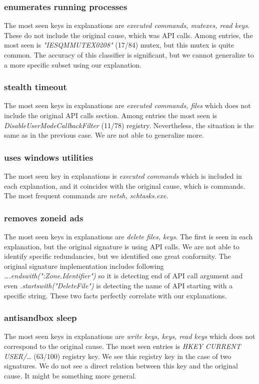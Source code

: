 \subsubsection*{enumerates running processes}
The most seen keys in explanations are \emph{executed commands, mutexes, read keys}. These do not include the original cause, which was API calls.  Among entries, the most seen is \emph{"IESQMMUTEX0208"} (17/84) mutex, but this mutex is quite common. The accuracy of this classifier is significant, but we cannot generalize to a more specific subset using our explanation.

\subsubsection*{stealth timeout}
The most seen keys in explanations are \emph{executed commands, files} which does not include the original API calls section. Among entries the most seen is \emph{DisableUserModeCallbackFilter} (11/78) registry. Nevertheless, the situation is the same as in the previous case. We are not able to generalize more.

\subsubsection*{uses windows utilities}
The most seen key in explanations is \emph{executed commands} which is included in each explanation, and it coincides with the original cause, which is commands. The most frequent commands are \emph{netsh, schtasks.exe}.

\subsubsection*{removes zoneid ads}
The most seen keys in explanations are \emph{delete files, keys}. The first is seen in each explanation, but the original signature is using API calls. We are not able to identify specific redundancies, but we identified one great conformity. The original signature implementation includes following \emph{\dots .endswith(":Zone.Identifier")} so it is detecting end of API call argument and even \emph{.startswith("DeleteFile")} is detecting the name of API starting with a specific string. These two facts perfectly correlate with our explanations.

\subsubsection*{antisandbox sleep}
The most seen keys in explanations are \emph{write keys, keys, read keys} which does not correspond to the original cause. The most seen entries is \emph{HKEY CURRENT USER/\dots} (63/100) registry key. We see this registry key in the case of two signatures. We do not see a direct relation between this key and the original cause. It might be something more general.

